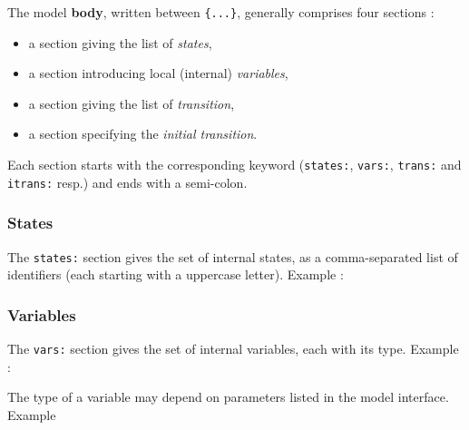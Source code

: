 \begin{center}
\end{center}

\medskip
The model \textbf{body}, written between \verb|{...}|, generally comprises four sections :
\begin{itemize}
\item a section giving the list of \emph{states},
\item a section introducing local (internal) \emph{variables},
\item a section giving the list of \emph{transition},
\item a section specifying the \emph{initial transition}.
\end{itemize}

Each section starts with the corresponding keyword (\verb|states:|, \verb|vars:|, \verb|trans:| and
\verb|itrans:| resp.) and ends with a semi-colon.

\begin{center}
\end{center}

\subsubsection*{States}
\label{sec:states}


The \verb|states:| section gives the set of internal states, as a comma-separated list of
identifiers (each starting with a uppercase letter). Example :

\begin{center}
\end{center}

\subsubsection*{Variables}
\label{sec:variables}

The \verb|vars:| section gives the set of internal variables, each with its type. Example :

\begin{center}
\end{center}

The type of a variable may depend on parameters listed in the model interface. Example

